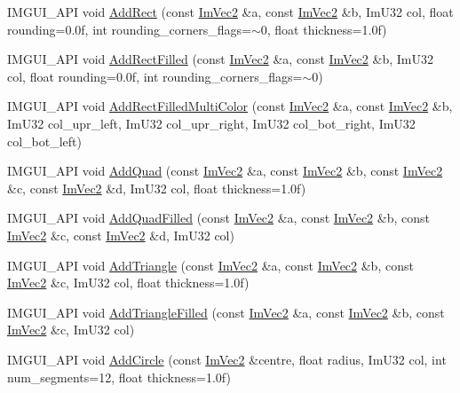 \begin{DoxyCompactItemize}
\item 
I\+M\+G\+U\+I\+\_\+\+A\+PI void \hyperlink{struct_im_draw_list_a6738c7d0b696273a37808554e1f15a0a}{Add\+Rect} (const \hyperlink{struct_im_vec2}{Im\+Vec2} \&a, const \hyperlink{struct_im_vec2}{Im\+Vec2} \&b, Im\+U32 col, float rounding=0.\+0f, int rounding\+\_\+corners\+\_\+flags=$\sim$0, float thickness=1.\+0f)
\item 
I\+M\+G\+U\+I\+\_\+\+A\+PI void \hyperlink{struct_im_draw_list_a1fa7c9165958909bba53c9740a607872}{Add\+Rect\+Filled} (const \hyperlink{struct_im_vec2}{Im\+Vec2} \&a, const \hyperlink{struct_im_vec2}{Im\+Vec2} \&b, Im\+U32 col, float rounding=0.\+0f, int rounding\+\_\+corners\+\_\+flags=$\sim$0)
\item 
I\+M\+G\+U\+I\+\_\+\+A\+PI void \hyperlink{struct_im_draw_list_ab658e574f3ef67a8d6cc0a86f13f5176}{Add\+Rect\+Filled\+Multi\+Color} (const \hyperlink{struct_im_vec2}{Im\+Vec2} \&a, const \hyperlink{struct_im_vec2}{Im\+Vec2} \&b, Im\+U32 col\+\_\+upr\+\_\+left, Im\+U32 col\+\_\+upr\+\_\+right, Im\+U32 col\+\_\+bot\+\_\+right, Im\+U32 col\+\_\+bot\+\_\+left)
\item 
I\+M\+G\+U\+I\+\_\+\+A\+PI void \hyperlink{struct_im_draw_list_ac3fd62862000b2a7a4e7f61da0a4e3fd}{Add\+Quad} (const \hyperlink{struct_im_vec2}{Im\+Vec2} \&a, const \hyperlink{struct_im_vec2}{Im\+Vec2} \&b, const \hyperlink{struct_im_vec2}{Im\+Vec2} \&c, const \hyperlink{struct_im_vec2}{Im\+Vec2} \&d, Im\+U32 col, float thickness=1.\+0f)
\item 
I\+M\+G\+U\+I\+\_\+\+A\+PI void \hyperlink{struct_im_draw_list_abefdc71c2dc6b6331193aee3ff680ed0}{Add\+Quad\+Filled} (const \hyperlink{struct_im_vec2}{Im\+Vec2} \&a, const \hyperlink{struct_im_vec2}{Im\+Vec2} \&b, const \hyperlink{struct_im_vec2}{Im\+Vec2} \&c, const \hyperlink{struct_im_vec2}{Im\+Vec2} \&d, Im\+U32 col)
\item 
I\+M\+G\+U\+I\+\_\+\+A\+PI void \hyperlink{struct_im_draw_list_ad04c8e04644b1cf54c7c7b8f352d5e41}{Add\+Triangle} (const \hyperlink{struct_im_vec2}{Im\+Vec2} \&a, const \hyperlink{struct_im_vec2}{Im\+Vec2} \&b, const \hyperlink{struct_im_vec2}{Im\+Vec2} \&c, Im\+U32 col, float thickness=1.\+0f)
\item 
I\+M\+G\+U\+I\+\_\+\+A\+PI void \hyperlink{struct_im_draw_list_a2395370cf2dab19fce3c0e2542cd4f25}{Add\+Triangle\+Filled} (const \hyperlink{struct_im_vec2}{Im\+Vec2} \&a, const \hyperlink{struct_im_vec2}{Im\+Vec2} \&b, const \hyperlink{struct_im_vec2}{Im\+Vec2} \&c, Im\+U32 col)
\item 
I\+M\+G\+U\+I\+\_\+\+A\+PI void \hyperlink{struct_im_draw_list_a26c34a87eca6aefa02ca4e4951dcd170}{Add\+Circle} (const \hyperlink{struct_im_vec2}{Im\+Vec2} \&centre, float radius, Im\+U32 col, int num\+\_\+segments=12, float thickness=1.\+0f)

\end{DoxyCompactItemize}
